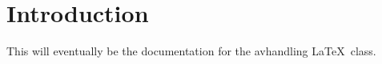 \chapter{Introduction}
\label{ch:introduction}

This will eventually be the documentation for the \textsf{avhandling} \LaTeX\ class.

